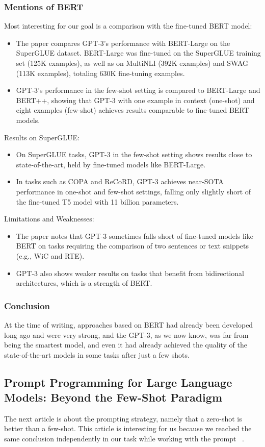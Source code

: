 \documentclass[11pt]{article}
\begin{document}
\subsubsection{Mentions of BERT}
Most interesting for our goal is a comparison with the fine-tuned BERT model:
\begin{itemize}
    \item The paper compares GPT-3’s performance with BERT-Large on the SuperGLUE dataset. BERT-Large was fine-tuned on the SuperGLUE training set (125K examples), as well as on MultiNLI (392K examples) and SWAG (113K examples), totaling 630K fine-tuning examples.
    \item GPT-3’s performance in the few-shot setting is compared to BERT-Large and BERT++, showing that GPT-3 with one example in context (one-shot) and eight examples (few-shot) achieves results comparable to fine-tuned BERT models.
\end{itemize}
Results on SuperGLUE:
\begin{itemize}
    \item On SuperGLUE tasks, GPT-3 in the few-shot setting shows results close to state-of-the-art, held by fine-tuned models like BERT-Large.
    \item In tasks such as COPA and ReCoRD, GPT-3 achieves near-SOTA performance in one-shot and few-shot settings, falling only slightly short of the fine-tuned T5 model with 11 billion parameters.
\end{itemize}
Limitations and Weaknesses:
\begin{itemize}
    \item The paper notes that GPT-3 sometimes falls short of fine-tuned models like BERT on tasks requiring the comparison of two sentences or text snippets (e.g., WiC and RTE).
    \item GPT-3 also shows weaker results on tasks that benefit from bidirectional architectures, which is a strength of BERT.
\end{itemize}
\subsubsection{Conclusion}
At the time of writing, approaches based on BERT had already been developed long ago and were very strong, and the GPT-3, as we now know, was far from being the smartest model, and even it had already achieved the quality of the state-of-the-art models in some tasks after just a few shots.

\subsection{Prompt Programming for Large Language Models: Beyond the Few-Shot Paradigm}
The next article is about the prompting strategy, namely that a zero-shot is better than a few-shot. This article is interesting for us because we reached the same conclusion independently in our task while working with the prompt ~\cite{PPfLLM:2021}.
\end{document}
